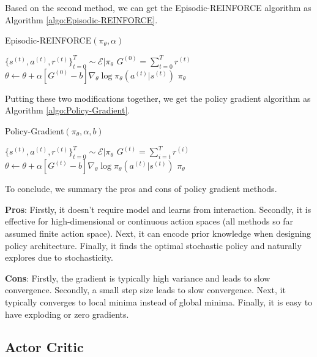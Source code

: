 \documentclass[11pt]{article}
\begin{document}
Based on the second method, we can get the Episodic-REINFORCE algorithm as Algorithm \ref{algo:Episodic-REINFORCE}.

\begin{algorithm}[H]
\caption{Episodic-REINFORCE$(\pi_\theta,\alpha)$}
\label{algo:Episodic-REINFORCE}
\begin{algorithmic}[1]
\STATE $\{s^{(t)},a^{(t)},r^{(t)}\}_{t=0}^T \sim \mathcal{E}|\pi_\theta $
\STATE $G^{(0)} = \sum_{t=0}^T r^{(t)}$
\STATE $\theta \leftarrow \theta+\alpha [G^{(0)}-b]\nabla_{\theta}\log{\pi_\theta(a^{(t)}|s^{(t)})}$
\ENDFOR
\ENDFOR 
\RETURN $\pi_\theta$
\end{algorithmic}
\end{algorithm}



Putting these two modifications together, we get the policy gradient algorithm as Algorithm \ref{algo:Policy-Gradient}.

\begin{algorithm}[H]
\caption{Policy-Gradient$(\pi_\theta,\alpha, b)$}
\label{algo:Policy-Gradient}
\begin{algorithmic}[1]
\STATE $\{s^{(t)},a^{(t)},r^{(t)}\}_{t=0}^T \sim \mathcal{E}|\pi_\theta $
\STATE $G^{(t)} = \sum_{i=t}^T r^{(i)}$
\STATE $\theta \leftarrow \theta+\alpha [G^{(t)}-b]\nabla_{\theta}\log{\pi_\theta(a^{(t)}|s^{(t)})}$
\ENDFOR
\ENDFOR 
\RETURN $\pi_\theta$
\end{algorithmic}
\end{algorithm}

To conclude, we summary the pros and cons of 
policy gradient methods. 

\textbf{Pros}: Firstly, it doesn’t require model and learns from interaction. Secondly, it is effective for high-dimensional or continuous action spaces (all methods so far assumed finite 
action space). Next, it can encode prior knowledge when designing policy architecture. Finally, it finds the optimal stochastic policy and naturally explores due to stochasticity. 

\textbf{Cons}: Firstly, the gradient is typically high variance and leads to slow convergence. Secondly, a small step size leads to slow convergence. Next, it typically converges to local minima instead of global 
minima. Finally, it is easy to have exploding or zero gradients.


\subsection{Actor Critic}
\end{document}
